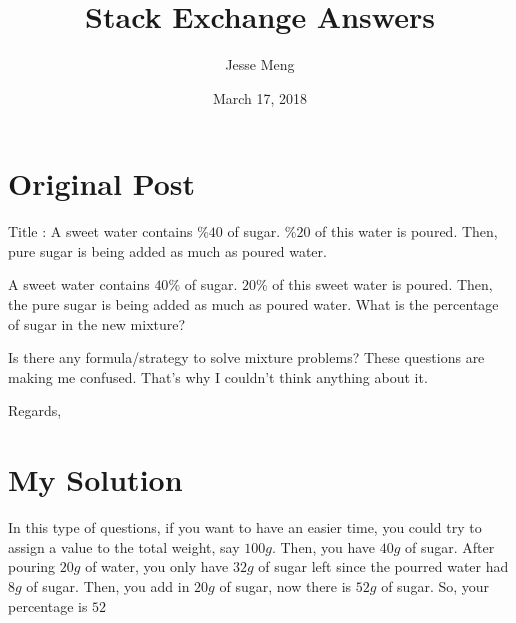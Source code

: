 \documentclass{article}
\title{Stack Exchange Answers}
\author{Jesse Meng }
\date{March 17, 2018}
\begin{document}
\maketitle

\section{Original Post}
Title : A sweet water contains $\%40$ of sugar. $\%20$ of this water is poured. Then, pure sugar is being added as much as poured water.

A sweet water contains $40\%$ of sugar. $20\%$ of this sweet water is poured. Then, the pure sugar is being added as much as poured water. What is the percentage of sugar in the new mixture?

Is there any formula/strategy to solve mixture problems? These questions are making me confused. That's why I couldn't think anything about it. 

Regards,
\section{My Solution}
In this type of questions, if you want to have an easier time, you could try to assign a value to the total weight, say $100g$. Then, you have $40g$ of sugar. After pouring $20g$ of water, you only have $32g$ of sugar left since the pourred water had $8g$ of sugar. Then, you add in $20g$ of sugar, now there is $52g$ of sugar. So, your percentage is $52$%
\end{document}
